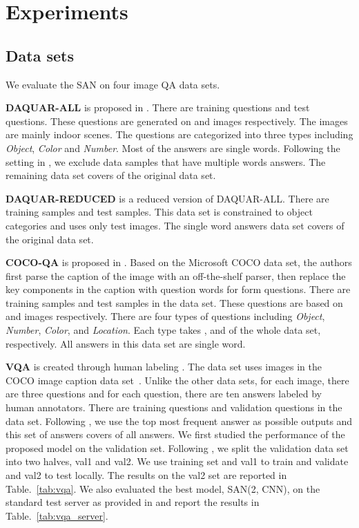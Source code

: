 \documentclass[10pt,twocolumn,letterpaper]{article}
\begin{document}
\section{Experiments}
\label{sec:experiments}
\subsection{Data sets}
We evaluate the SAN on four image QA data sets.

{\bf DAQUAR-ALL} is proposed in \cite{malinowski2014multi}. There are 
training questions and  test questions. These questions are generated on
 and  images respectively. The images are mainly indoor scenes. The
questions are categorized into three types including \emph{Object},
\emph{Color} and \emph{Number}. Most of the answers are single words. Following
the setting in \cite{ren2015imageqa, ma2015learning, malinowski2015ask}, we
exclude data samples that have multiple words answers. The remaining data set
covers  of the original data set.

{\bf DAQUAR-REDUCED} is a reduced version of DAQUAR-ALL. There are 
training samples and  test samples. This data set is constrained to 
object categories and uses only  test images. The single word answers data
set covers  of the original data set.


{\bf COCO-QA} is proposed in \cite{ren2015imageqa}. Based on the Microsoft COCO
data set, the authors first parse the caption of the image with an
off-the-shelf parser, then replace the key components in the caption with
question words for form questions. There are  training samples and
 test samples in the data set. These questions are based on  and
 images respectively. There are four types of questions including
\emph{Object}, \emph{Number}, \emph{Color}, and \emph{Location}. Each type
takes , and  of the whole data set, respectively. All
answers in this data set are single word.

{\bf VQA} is created through human labeling \cite{antol2015vqa}. The data set
uses images in the COCO image caption data set~\cite{lin2014microsoft}. Unlike
the other data sets, for each image, there are three questions and for each
question, there are ten answers labeled by human annotators. There are
 training questions and  validation questions in the data set. Following \cite{antol2015vqa}, we use the top  most frequent answer
as possible outputs and this set of answers covers  of all answers.
We first studied the performance of the proposed model on the validation set.
Following \cite{fang2014captions}, we split the validation data set into two
halves, val1 and val2. We use training set and val1 to train and validate and
val2 to test locally. The results on the val2 set are reported in
Table.~\ref{tab:vqa}. We also evaluated the best model, SAN(2, CNN), on the
standard test server as provided in \cite{antol2015vqa} and report the results
in Table.~\ref{tab:vqa_server}.
\end{document}
